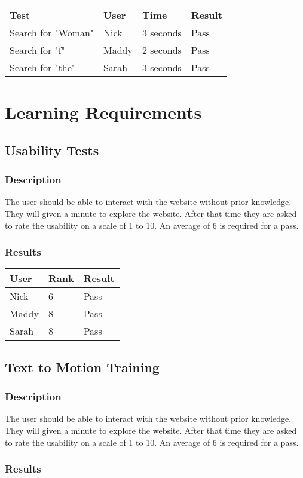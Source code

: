 \documentclass{scrreprt}
\begin{document}
 \centering
 \begin{tabular}{||p{4.5cm}|p{2.5cm}|p{2.5cm}|p{2.5cm}||}
 \hline
 \bf Test & \bf User & \bf Time & \bf Result \\
 \hline\hline
   Search for "Woman" & Nick & 3 seconds  & Pass\\ %
 \hline\hline
   Search for "f" & Maddy & 2 seconds  & Pass\\
 \hline\hline
   Search for "the" & Sarah & 3 seconds  & Pass\\
 \hline
 \end{tabular}

\section{Learning Requirements}

\subsection{Usability Tests}
\subsubsection{Description}
\begin{flushleft}
The user should be able to interact with the website without prior knowledge. They will given a minute to explore the website. After that time they are asked to rate the usability on a scale of 1 to 10. An average of 6 is required for a pass.
\subsubsection{Results}
\end{flushleft}

 \centering
 \begin{tabular}{||p{2.5cm}|p{2.5cm}|p{2.5cm}||}
 \hline
 \bf User & \bf Rank & \bf Result\\
 \hline\hline
 Nick & 6 & Pass \\
 \hline
 Maddy & 8 & Pass \\ 
 \hline
 Sarah & 8 & Pass\\
 \hline
 \end{tabular}

\subsection{Text to Motion Training }
\subsubsection{Description}
\begin{flushleft}
The user should be able to interact with the website without prior knowledge. They will given a minute to explore the website. After that time they are asked to rate the usability on a scale of 1 to 10. An average of 6 is required for a pass.
\subsubsection{Results}
\end{flushleft}
\end{document}

